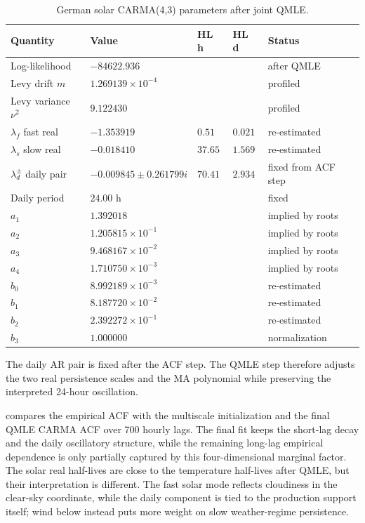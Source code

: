 \begin{table}[!htbp]
  \centering
  \caption{German solar CARMA(4,3) parameters after joint QMLE.}
  \label{tab:solar-carma-after-qmle}
  \begin{tabular}{@{}lllll@{}}
    \toprule
    Quantity & Value & HL h & HL d & Status \\
    \midrule
    Log-likelihood & \(-84622.936\) & & & after QMLE \\
    Levy drift \(m\) & \(1.269139{\times}10^{-4}\) & & & profiled \\
    Levy variance \(\nu^2\) & \(9.122430\) & & & profiled \\
    \midrule
    \(\lambda_f\) fast real & \(-1.353919\) & \(0.51\) & \(0.021\) & re-estimated \\
    \(\lambda_s\) slow real & \(-0.018410\) & \(37.65\) & \(1.569\) & re-estimated \\
    \(\lambda_d^\pm\) daily pair & \(-0.009845\pm0.261799i\) & \(70.41\) & \(2.934\) & fixed from ACF step \\
    Daily period & \(24.00\) h & & & fixed \\
    \midrule
    \(a_1\) & \(1.392018\) & & & implied by roots \\
    \(a_2\) & \(1.205815{\times}10^{-1}\) & & & implied by roots \\
    \(a_3\) & \(9.468167{\times}10^{-2}\) & & & implied by roots \\
    \(a_4\) & \(1.710750{\times}10^{-3}\) & & & implied by roots \\
    \midrule
    \(b_0\) & \(8.992189{\times}10^{-3}\) & & & re-estimated \\
    \(b_1\) & \(8.187720{\times}10^{-2}\) & & & re-estimated \\
    \(b_2\) & \(2.392272{\times}10^{-1}\) & & & re-estimated \\
    \(b_3\) & \(1.000000\) & & & normalization \\
    \bottomrule
  \end{tabular}
\end{table}

\FloatBarrier

The daily AR pair is fixed after the ACF step. The QMLE step therefore adjusts
the two real persistence scales and the MA polynomial while preserving the
interpreted 24-hour oscillation.

 compares the empirical ACF with the multiscale
initialization and the final QMLE CARMA ACF over 700 hourly lags. The final fit
keeps the short-lag decay and the daily oscillatory structure, while the
remaining long-lag empirical dependence is only partially captured by this
four-dimensional marginal factor.
The solar real half-lives are close to the temperature half-lives after QMLE,
but their interpretation is different. The fast solar mode reflects cloudiness
in the clear-sky coordinate, while the daily component is tied to the production
support itself; wind below instead puts more weight on slow weather-regime
persistence.

